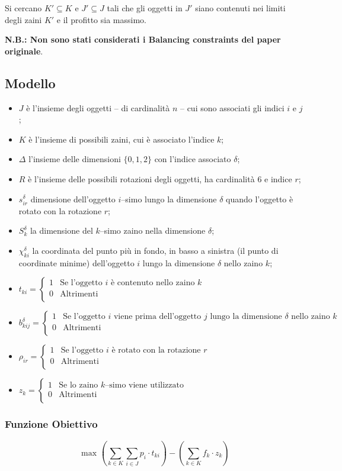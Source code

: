 \documentclass{scrartcl}
\newcommand{\MutliLineEquation}[3]{ 
	\ensuremath{
		#1 = \left\{
		\begin{array}{ll}
		1& \text{#2} \\
		0& \text{#3} \\
		\end{array}
		\right.
	}
}
\begin{document}
Si cercano $K' \subseteq K$ e $J' \subseteq J$ tali che gli oggetti in $J'$ siano contenuti nei limiti degli zaini $K'$ e il profitto sia massimo.


\textbf{N.B.: Non sono stati considerati i Balancing constraints del paper originale}.

\subsection{Modello}
\label{sec:original:model}
\begin{itemize}
	\item $J$ è l'insieme degli oggetti -- di cardinalità $n$ -- cui sono associati gli indici $i$ e $j$;
	\item $K$ è l'insieme di possibili zaini, cui è associato l'indice $k$;
	\item $\Delta$ l'insieme delle dimensioni $\{0,1,2\}$ con l'indice associato $\delta$;
	\item $R$ è l'insieme delle possibili rotazioni degli oggetti, ha cardinalità $6$ e indice $r$;
	\item $s_{ir}^\delta$ dimensione dell'oggetto $i$--simo lungo la dimensione $\delta$ quando l'oggetto è rotato con la rotazione $r$;
	\item $S_{k}^\delta$ la dimensione del $k$--simo zaino nella dimensione $\delta$;
	\item $\chi_{ki}^\delta$ la coordinata del punto più in fondo, in basso a sinistra  (il punto di coordinate minime) dell'oggetto $i$ lungo la dimensione $\delta$ nello zaino $k$;
	\item \MutliLineEquation{t_{ki}}{Se l'oggetto $i$ è contenuto nello zaino $k$}{Altrimenti}
	\item \MutliLineEquation{b_{kij}^\delta}{Se l'oggetto $i$ viene prima dell'oggetto $j$ lungo la dimensione $\delta$ nello zaino $k$}{Altrimenti}
	\item \MutliLineEquation{\rho_{ir}}{Se l'oggetto $i$ è rotato con la rotazione $r$}{Altrimenti}
	\item \MutliLineEquation{z_k}{Se lo zaino $k$--simo viene utilizzato}{Altrimenti}
	
\end{itemize}



\subsubsection{Funzione Obiettivo}
\begin{equation}
\text{ max }\left(\sum_{k \in K} \sum_{i \in J} p_i \cdot t_{ki}\right) - \left(\sum_{k \in K} f_k \cdot z_k\right)
\end{equation}
\end{document}
